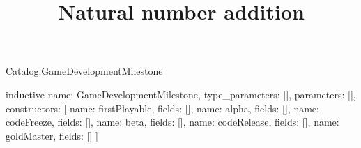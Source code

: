\begin{lexlean}{Catalog.GameDevelopmentMilestone}
\title{Natural number addition}
\begin{semanticmodule}
inductive{
  name: GameDevelopmentMilestone,
  type_parameters: [],
  parameters: [],
  constructors: [
    {name: firstPlayable, fields: []},
    {name: alpha, fields: []},
    {name: codeFreeze, fields: []},
    {name: beta, fields: []},
    {name: codeRelease, fields: []},
    {name: goldMaster, fields: []}
  ]
}
\end{semanticmodule}
\end{lexlean}

